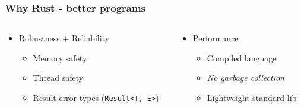 \documentclass[aspectratio=169]{beamer}
\begin{document}
\begin{frame}
  \frametitle{Why Rust  - better programs}

  \begin{columns}
    \begin{column}{.5\linewidth}
      \begin{itemize}
      \item Robustness + Reliability
        \begin{itemize}
        \item Memory safety
        \item Thread safety
        \item Result error types (\texttt{Result<T, E>})
        \end{itemize}
      \end{itemize}
    \end{column}

    \pause

    \begin{column}{.5\linewidth}
      \begin{itemize}
      \item Performance
        \begin{itemize}
        \item Compiled language
        \item \emph{No garbage collection}
        \item Lightweight standard lib
        \end{itemize}
      \end{itemize}
    \end{column}
  \end{columns}
\end{frame}
\end{document}

